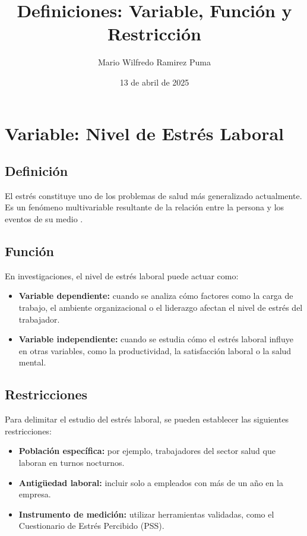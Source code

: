 \documentclass[12pt]{article}
\title{Definiciones: Variable, Función y Restricción}
\author{Mario Wilfredo Ramirez Puma}
\date{13 de abril de 2025}
\begin{document}
	
	\maketitle
	
	\section*{Variable: Nivel de Estrés Laboral}
	
	\subsection*{Definición}
	El estrés constituye uno de los problemas de salud más generalizado actualmente. Es un fenómeno multivariable resultante de la relación entre la persona y los eventos de su medio \citep{alfonso2015estres}.
	
	\subsection*{Función}
	En investigaciones, el nivel de estrés laboral puede actuar como:
	
	\begin{itemize}
		\item \textbf{Variable dependiente:} cuando se analiza cómo factores como la carga de trabajo, el ambiente organizacional o el liderazgo afectan el nivel de estrés del trabajador.
		\item \textbf{Variable independiente:} cuando se estudia cómo el estrés laboral influye en otras variables, como la productividad, la satisfacción laboral o la salud mental.
	\end{itemize}
	
	\subsection*{Restricciones}
	Para delimitar el estudio del estrés laboral, se pueden establecer las siguientes restricciones:
	
	\begin{itemize}
		\item \textbf{Población específica:} por ejemplo, trabajadores del sector salud que laboran en turnos nocturnos.
		\item \textbf{Antigüedad laboral:} incluir solo a empleados con más de un año en la empresa.
		\item \textbf{Instrumento de medición:} utilizar herramientas validadas, como el Cuestionario de Estrés Percibido (PSS).
	\end{itemize}
	
\end{document}
